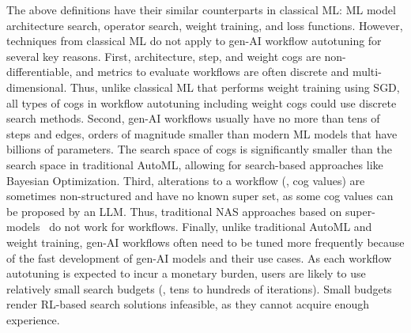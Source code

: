 The above definitions have their similar counterparts in classical ML: ML model architecture search, operator search, weight training, and loss functions.
However, techniques from classical ML do not apply to gen-AI workflow autotuning for several key reasons.
First, architecture, step, and weight cogs are non-differentiable, and metrics to evaluate workflows are often discrete and multi-dimensional.
Thus, unlike classical ML that performs weight training using SGD, all types of cogs in workflow autotuning including weight cogs could use discrete search methods.
Second, gen-AI workflows usually have no more than tens of steps and edges, orders of magnitude smaller than modern ML models that have billions of parameters.
The search space of cogs is significantly smaller than the search space in traditional AutoML, allowing for search-based approaches like Bayesian Optimization.
Third, alterations to a workflow (\ie, cog values) are sometimes non-structured and have no known super set, as some cog values can be proposed by an LLM. Thus, traditional NAS approaches based on super-models~\cite{ENAS} do not work for workflows.
Finally, unlike traditional AutoML and weight training, gen-AI workflows often need to be tuned more frequently because of the fast development of gen-AI models and their use cases. As each workflow autotuning is expected to incur a monetary burden, users are likely to use relatively small search budgets (\eg, tens to hundreds of iterations). Small budgets render RL-based search solutions infeasible, as they cannot acquire enough experience. 


